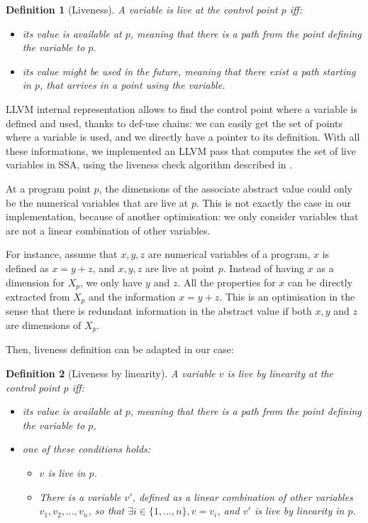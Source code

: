 \documentclass[a4paper,english,titlepage,11pt]{report}
\newtheorem{definition}{Definition}[section]
\begin{document}
	\begin{definition}[Liveness]
	A variable is \emph{live} at the control point $p$ iff:
	\begin{itemize}
	\item its value is available at $p$, meaning that there is a path from the
	point defining the variable to $p$.
	\item its value might be used in the future, meaning that there exist a path
	starting in $p$, that arrives in a point using the variable.
	\end{itemize}
	\end{definition}

	LLVM internal representation allows to find the control point where
	a variable is defined and used, thanks to def-use chains: we can
	easily get the set of points where a variable is used, and we directly have
	a pointer to its definition.
	With all these informations, we implemented an LLVM pass that computes 
	the set of live variables in SSA, using the liveness check algorithm
	described in \cite[section 3.3]{Boi10}.

	
	At a program point $p$, the dimensions of the associate abstract value could
	only be the numerical variables that are live at $p$. This is
	not exactly the case in our implementation, because of another 
	optimisation: we only consider
	variables that are not a linear combination of other variables.

	For instance, assume that $x,y,z$ are numerical variables of a program,
	$x$ is defined as $x = y+z$, and $x,y,z$ are live at point $p$. Instead of having
	$x$ as a dimension for $X_p$, we only have $y$ and $z$. All the properties
	for $x$ can be directly extracted from $X_p$ and the information $x=y+z$.
	This is an optimisation in the sense that there is redundant information in
	the abstract value if both $x,y$ and $z$ are dimensions of $X_p$.

	Then, liveness definition can be adapted in our case:

	\begin{definition}[Liveness by linearity]
	A variable $v$ is \emph{live by linearity} at the control point $p$ iff:
	\begin{itemize}
	\item 
	its value is available at $p$, meaning that there is a path from the
	point defining the variable to $p$,
	\item one of these conditions holds:
		\begin{itemize}
		\item $v$ is live in $p$.
		\item There is a variable $v'$, defined as a linear combination of other
		variables $v_1, v_2, \dots, v_n$, so that $\exists i \in \{1,\dots,n\}, v = v_i$,
		and $v'$ is live by linearity in $p$.
		\end{itemize}
	\end{itemize}
	\end{definition}
\end{document}
